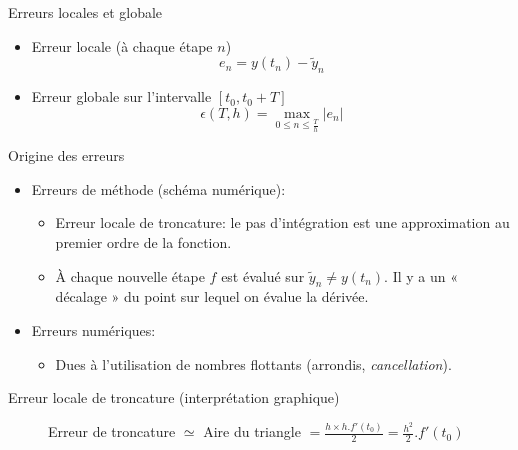\documentclass{beamer}
\begin{document}
\begin{frame}{Erreurs locales et globale}

    \begin{itemize}
        \item Erreur locale (à chaque étape $n$)
              \[e_n = y(t_n) - \widetilde{y}_n\]

        \item Erreur globale sur l'intervalle $[t_0, t_0+T]$
              \[ \epsilon(T, h) = \max_{0 \leq n \leq \frac{T}{h}} |e_n| \]

    \end{itemize}


\end{frame}

\begin{frame}{Origine des erreurs}
    \begin{itemize}
        \item Erreurs de méthode (schéma numérique):
              \begin{itemize}
                  \item Erreur locale de troncature: le pas d'intégration est une
                        approximation au premier ordre de la fonction.
                  \item À chaque nouvelle étape $f$ est évalué sur $\widetilde{y}_n \neq y(t_n)$.
                        Il y a un « décalage » du point sur lequel on évalue la dérivée.
              \end{itemize}


        \item Erreurs numériques:
              \begin{itemize}
                  \item Dues à l'utilisation de nombres flottants (arrondis, \emph{cancellation}).
              \end{itemize}
    \end{itemize}
\end{frame}

\begin{frame}{Erreur locale de troncature (interprétation graphique)}
    \begin{figure}
        \caption{Erreur de troncature $\simeq$ \newline Aire du triangle $= \frac{h \times h.f'(t_0)}{2} = \frac{h^2}{2}.f'(t_0)$}
    \end{figure}
\end{frame}
\end{document}
